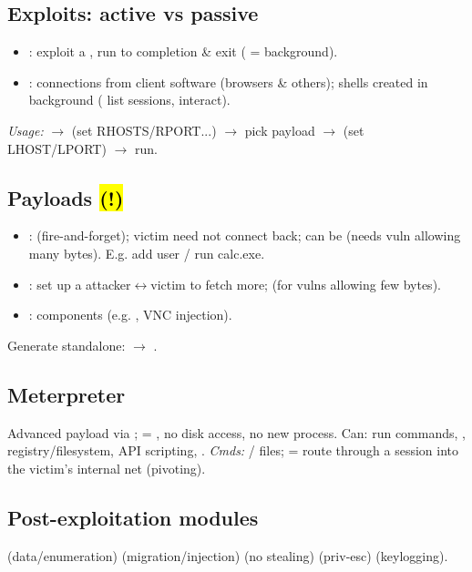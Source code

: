\subsection{Exploits: active vs passive}
\begin{itemize}
\item {}: exploit a , run to completion \& exit ( = background).
\item {}:  connections from client software (browsers \& others); shells created in background ( list sessions,  interact).
\end{itemize}
\textit{Usage:}  $\to$  (set RHOSTS/RPORT...) $\to$ pick payload $\to$  (set LHOST/LPORT) $\to$ run.

\subsection{Payloads \hl{(!)}}
\begin{itemize}
\item {}:  (fire-and-forget); victim need not connect back; can be  (needs vuln allowing many bytes). E.g. add user / run calc.exe.
\item {}: set up a  attacker$\leftrightarrow$victim to fetch more;  (for vulns allowing few bytes).
\item {}: components  (e.g. , VNC injection).
\end{itemize}
Generate standalone:  $\to$ .

\subsection{Meterpreter}
Advanced  payload via ;  = , no disk access, no new process. Can: run commands, , registry/filesystem, API scripting, .
\textit{Cmds:} / files;  = route through a session into the victim's internal net (pivoting).

\subsection{Post-exploitation modules}
 (data/enumeration) \textbullet{}  \textbullet{}  \textbullet{}  (migration/injection) \textbullet{}  (no stealing) \textbullet{}  (priv-esc) \textbullet{}  \textbullet{}  (keylogging).

